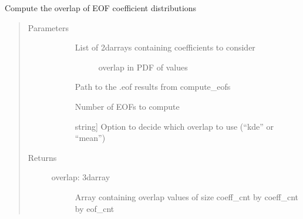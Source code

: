 \documentclass[letterpaper,10pt,english]{sphinxmanual}
\begin{document}
\begin{fulllineitems}
\label{\detokenize{stochprop.eofs:stochprop.eofs.compute_overlap}}
\sphinxAtStartPar
Compute the overlap of EOF coefficient distributions
\begin{quote}\begin{description}
\item[{Parameters}] \leavevmode\begin{description}
\item[{}] \leavevmode\begin{description}
\item[{List of 2darrays containing coefficients to consider}] \leavevmode
\sphinxAtStartPar
overlap in PDF of values

\end{description}

\item[{}] \leavevmode
\sphinxAtStartPar
Path to the .eof results from compute\_eofs

\item[{}] \leavevmode
\sphinxAtStartPar
Number of EOFs to compute

\item[{}] \leavevmode{[}string{]}
\sphinxAtStartPar
Option to decide which overlap to use (“kde” or “mean”)

\end{description}

\item[{Returns}] \leavevmode\begin{description}
\item[{overlap: 3darray}] \leavevmode
\sphinxAtStartPar
Array containing overlap values of size coeff\_cnt by coeff\_cnt by eof\_cnt

\end{description}

\end{description}\end{quote}

\end{fulllineitems}
\end{document}
